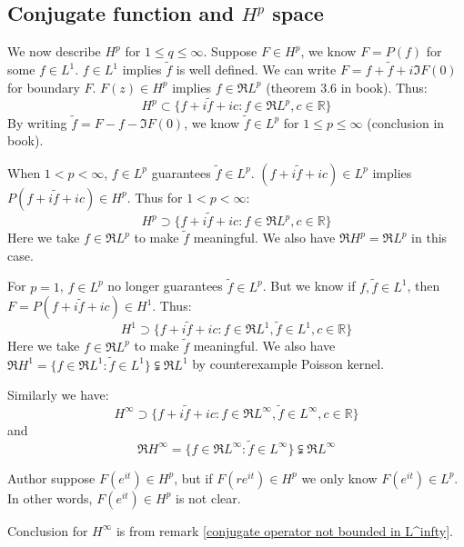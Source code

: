 \subsection{Conjugate function and $H^p$ space}
We now describe $H^p$ for $1\leq q\leq \infty$. Suppose $F\in H^p$, we know $F=P(f)$ for some $f\in L^1$. $f\in L^1$ implies $\tilde{f}$ is well defined.
We can write $F=f+\tilde{f}+i\Im{F(0)}$ for boundary $F$. $F(z)\in H^p$ implies $f\in\Re{L^p}$ (theorem 3.6 in book). Thus:
\begin{equation*}
    H^p\subset\{f+i\tilde{f}+i c:f\in\Re{L^p}, c\in\mathbb{R}\}
\end{equation*}
{\color{blue} By writing $\tilde{f}=F-f-\Im{F(0)}$, we know $\tilde{f}\in L^p$ for $1\leq p\leq\infty$ (conclusion in book)}.\par
When $1<p<\infty$, $f\in L^p$ guarantees $\tilde{f}\in L^p$. $(f+i\tilde{f}+ic)\in L^p$ implies $P(f+i\tilde{f}+ic)\in H^p$. Thus for $1<p<\infty$:
\begin{equation*}
    H^p\supset\{f+i\tilde{f}+i c:f\in\Re{L^p}, c\in\mathbb{R}\}
\end{equation*}
Here we take $f\in\Re{L^p}$ to make $\tilde{f}$ meaningful. We also have $\Re{H^p}=\Re{L^p}$ in this case.\par
For $p=1$, $f\in L^p$ no longer guarantees $\tilde{f}\in L^p$. But we know if $f,\tilde{f}\in L^1$, then $F=P(f+i\tilde{f}+ic)\in H^1$. Thus:
\begin{equation*}
    H^1\supset\{f+i\tilde{f}+i c:f\in\Re{L^1},\tilde{f}\in{L^1}, c\in\mathbb{R}\}
\end{equation*}
Here we take $f\in\Re{L^p}$ to make $\tilde{f}$ meaningful. We also have $ \Re{H^1}=\{f\in\Re{L^1}:\tilde{f}\in{L^1}\}\subsetneqq\Re{L^1}$ by counterexample Poisson kernel.\par
Similarly we have:
\begin{equation*}
    H^\infty\supset\{f+i\tilde{f}+i c:f\in\Re{L^\infty},\tilde{f}\in{L^\infty}, c\in\mathbb{R}\}
\end{equation*}
and
\begin{equation*}
    \Re{H^\infty}=\{f\in\Re{L^\infty}:\tilde{f}\in{L^\infty}\}\subsetneqq\Re{L^\infty}
\end{equation*}
\begin{remark}
    Author suppose $F(e^{it})\in H^p$, but if $F(re^{it})\in H^p$ we only know $F(e^{it})\in L^p$. {\color{red}In other words, $F(e^{it})\in H^p$ is not clear}.\par
    Conclusion for $H^\infty$ is from remark \ref{conjugate operator not bounded in L^infty}.
\end{remark}
